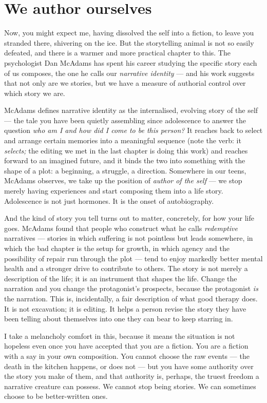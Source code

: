 \section*{We author ourselves}

Now, you might expect me, having dissolved the self into a fiction, to leave you stranded there, shivering on the ice. But the storytelling animal is not so easily defeated, and there is a warmer and more practical chapter to this. The psychologist Dan McAdams has spent his career studying the specific story each of us composes, the one he calls our \emph{narrative identity} — and his work suggests that not only are we stories, but we have a measure of authorial control over which story we are.

McAdams defines narrative identity as the internalised, evolving story of the self — the tale you have been quietly assembling since adolescence to answer the question \emph{who am I and how did I come to be this person?} It reaches back to select and arrange certain memories into a meaningful sequence (note the verb: it \emph{selects;} the editing we met in the last chapter is doing this work) and reaches forward to an imagined future, and it binds the two into something with the shape of a plot: a beginning, a struggle, a direction. Somewhere in our teens, McAdams observes, we take up the position of \emph{author of the self} — we stop merely having experiences and start composing them into a life story. Adolescence is not just hormones. It is the onset of autobiography.

And the kind of story you tell turns out to matter, concretely, for how your life goes. McAdams found that people who construct what he calls \emph{redemptive} narratives — stories in which suffering is not pointless but leads somewhere, in which the bad chapter is the setup for growth, in which agency and the possibility of repair run through the plot — tend to enjoy markedly better mental health and a stronger drive to contribute to others. The story is not merely a description of the life; it is an instrument that shapes the life. Change the narration and you change the protagonist's prospects, because the protagonist \emph{is} the narration. This is, incidentally, a fair description of what good therapy does. It is not excavation; it is editing. It helps a person revise the story they have been telling about themselves into one they can bear to keep starring in.

I take a melancholy comfort in this, because it means the situation is not hopeless even once you have accepted that you are a fiction. You are a fiction with a say in your own composition. You cannot choose the raw events — the death in the kitchen happens, or does not — but you have some authority over the story you make of them, and that authority is, perhaps, the truest freedom a narrative creature can possess. We cannot stop being stories. We can sometimes choose to be better-written ones.

